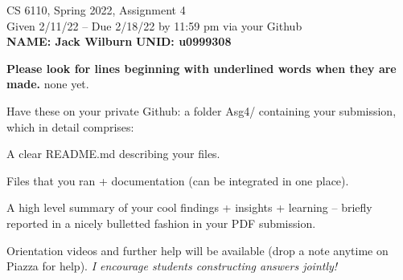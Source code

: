 \documentclass[11pt]{article}
\begin{document}

\newlength{\minpagw}
\settowidth{\minpagw}{\hspace{40em}}

\begin{center}
\begin{large}
  CS 6110, Spring 2022, Assignment 4  \\
  Given 2/11/22 -- Due 2/18/22 by 11:59 pm via your Github 
  \ \\
    {  {\Large\bf NAME: Jack Wilburn} \hfill {\Large\bf UNID: u0999308}\hspace{4cm} }
          \ \\
\end{large}

\end{center}

 {\bf Please look for lines beginning with underlined words when they are made.}
         {\tiny none yet.}

         Have these on your private Github:
         a folder Asg4/ containing your submission, which in detail comprises:
         \begin{compactitem}
         \item A clear README.md describing your files.
         \item Files that you ran + documentation (can be integrated in one place).
         \item A high level summary of your cool findings + insights + learning -- briefly reported in
           a nicely bulletted fashion in your PDF submission.
         \end{compactitem}

Orientation videos and further help will be available (drop a note anytime
on Piazza for help). {\em I encourage students constructing answers jointly!}
\end{document}
